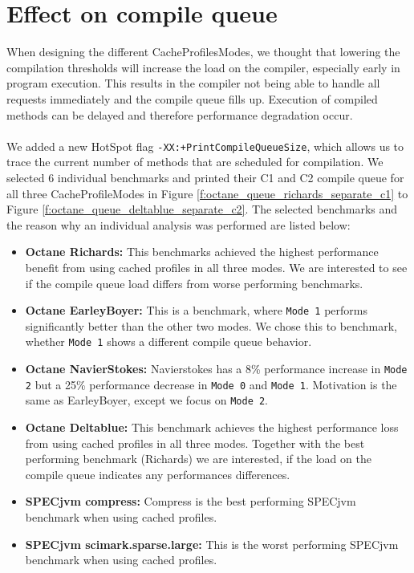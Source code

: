\section{Effect on compile queue}
\label{s:perf_compilequeue}
When designing the different CacheProfilesModes, we thought that lowering the compilation thresholds will increase the load on the compiler, especially early in program execution. This results in the compiler not being able to handle all requests immediately and the compile queue fills up. Execution of compiled methods can be delayed and therefore performance degradation occur.
\\\\
We added a new HotSpot flag \texttt{-XX:+PrintCompileQueueSize}, which allows us to trace the current number of methods that are scheduled for compilation. We selected 6 individual benchmarks and printed their C1 and C2 compile queue for all three CacheProfileModes in Figure \ref{f:octane_queue_richards_separate_c1} to Figure \ref{f:octane_queue_deltablue_separate_c2}.
The selected benchmarks and the reason why an individual analysis was performed are listed below:
\begin{itemize}
  \item \textbf{Octane Richards:} This benchmarks achieved the highest performance benefit from using cached profiles in all three modes. We are interested to see if the compile queue load differs from worse performing benchmarks.
  \item \textbf{Octane EarleyBoyer:} This is a benchmark, where \texttt{Mode 1} performs significantly better than the other two modes. We chose this to benchmark, whether \texttt{Mode 1} shows a different compile queue behavior.
  \item \textbf{Octane NavierStokes:} Navierstokes has a 8\% performance increase in \texttt{Mode 2} but a 25\% performance decrease in \texttt{Mode 0} and \texttt{Mode 1}. Motivation is the same as EarleyBoyer, except we focus on \texttt{Mode 2}.
  \item \textbf{Octane Deltablue:} This benchmark achieves the highest performance loss from using cached profiles in all three modes. Together with the best performing benchmark (Richards) we are interested, if the load on the compile queue indicates any performances differences.
  \item \textbf{SPECjvm compress:} Compress is the best performing SPECjvm benchmark when using cached profiles. 
  \item \textbf{SPECjvm scimark.sparse.large:} This is the worst performing SPECjvm benchmark when using cached profiles. 
\end{itemize}
